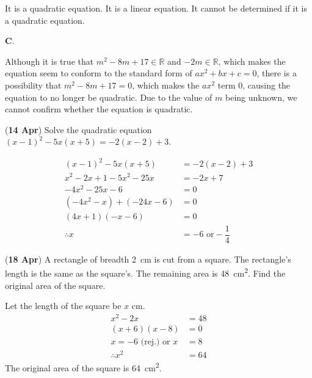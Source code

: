 \documentclass[12pt, answers]{exam} %
\newcommand{\reals}{\mathbb{R}}
\renewcommand{\frac}[2]{\dfrac{#1}{#2}}
\begin{document}
\begin{questions}
	\begin{choices}
		\choice It is a quadratic equation.
		\choice It is a linear equation.
		\choice It cannot be determined if it is a quadratic equation.
	\end{choices}

	\begin{solution}
		\textbf{C}.

		Although it is true that \(m^{2} - 8m + 17 \in \reals\) and \(-2m \in \reals\),
		which makes the equation seem to conform to the standard form of
		\(ax^{2} + bx + c = 0\), there is a possibility that
		\(m^{2} - 8m + 17 = 0\), which makes the \(ax^{2}\) term \(0\),
		causing the equation to no longer be quadratic. Due to the value of \(m\) being unknown, we cannot confirm
		whether the equation is quadratic.
	\end{solution}

	\question (\textbf{14 Apr}) Solve the quadratic equation
	\((x - 1)^{2} - 5x(x + 5) = -2(x - 2) + 3\).
	\begin{solution}
		\begin{align*}
			(x - 1)^{2} - 5x(x + 5)                          & = -2(x - 2) + 3              \\
			x^{2} - 2x + 1 - 5x^{2} - 25x                    & = -2x + 7                    \\
			-4x^{2} - 25x - 6                                & = 0                          \\
			\left(-4x^{2} - x\right) + \left(-24x - 6\right) & = 0                          \\
			(4x + 1)(- x - 6)                                & = 0                          \\
			\therefore x                                     & = -6 \text{ or} -\frac{1}{4}
		\end{align*}
	\end{solution}

	\question (\textbf{18 Apr}) A rectangle of breadth \qty{2}{\centi\metre} is cut from a square.
	The rectangle's length is the same as the square's.
	The remaining area is \qty{48}{\square\centi\metre}.
	Find the original area of the square.
	\begin{solution}
		Let the length of the square be \(x\) \si{\centi\metre}.
		\begin{align*}
			x^{2} - 2x                  & = 48 \\
			(x + 6)(x - 8)              & = 0  \\
			x = -6 \text{ (rej.) or } x & = 8  \\
			\therefore  x^{2}           & = 64
		\end{align*}
		The original area of the square is \qty{64}{\square\centi\metre}.
	\end{solution}


\end{questions}
\end{document}
